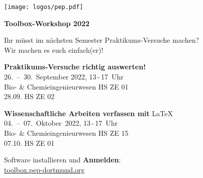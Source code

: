 \documentclass[paper=landscape]{scrartcl}
\begin{document}
  \begin{minipage}{0.25\textwidth}%
    \texttt{[image: logos/pep.pdf]}%
  \end{minipage}%
  \begin{minipage}{0.75\textwidth}%
    \centering\fontsize{50}{60}\bfseries\selectfont Toolbox-Workshop 2022%
  \end{minipage}%

  \vspace{0.5cm}

  \begin{center}
    \Huge Ihr müsst im nächsten Semester Praktikums-Versuche machen? \\[0.5\baselineskip]
    Wir machen es euch einfach(er)!
  \end{center}

  \vspace{0.1cm}

  \begin{center}
    \huge \textbf{Praktikums-Versuche richtig auswerten!} \\[0.5\baselineskip]
    26.~–~30.~September 2022, 13\,-\,17~Uhr \\
    Bio- \& Chemieingenieurwesen HS ZE 01\\
    28.09. HS ZE 02
  \end{center}
  \vspace{0.1cm}
  \begin{center}
    \huge \textbf{Wissenschaftliche Arbeiten verfassen mit} \textrm{\LaTeX}\\[0.5\baselineskip]
    04.~–~07.~Oktober~2022, 13\,-\,17~Uhr \\
    Bio- \& Chemieingenieurwesen HS ZE 15\\
    07.10. HS ZE 01
  \end{center}
  \vspace{0.1cm}
  \begin{center}
    \large Software installieren und \textbf{Anmelden}: \\
    \Huge \href{https://toolbox.pep-dortmund.org}{toolbox.pep-dortmund.org}
  \end{center}
\end{document}
